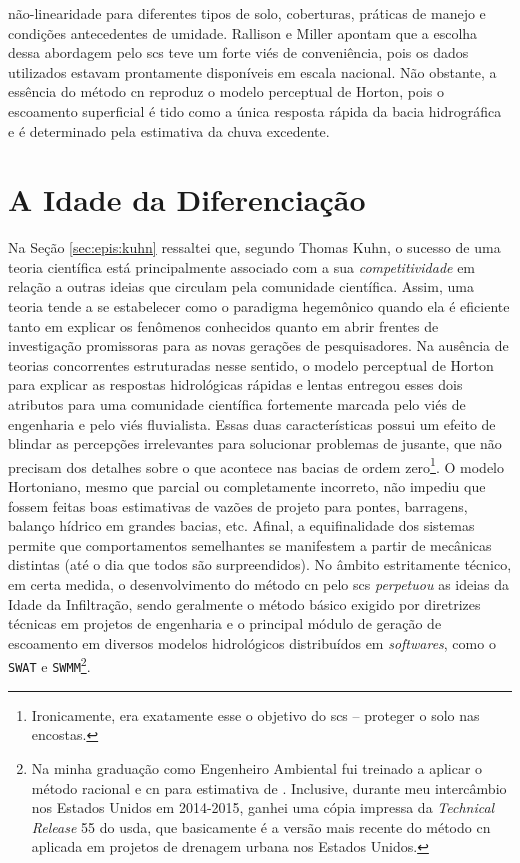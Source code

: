 \documentclass[./main.tex]{subfiles}
\begin{document}
não-linearidade para diferentes tipos de solo, coberturas, práticas de manejo e condições antecedentes de umidade. Rallison e Miller apontam que a escolha dessa abordagem pelo \acrshort{scs} teve um forte viés de conveniência, pois os dados utilizados estavam prontamente disponíveis em escala nacional. Não obstante, a essência do método \acrshort{cn} reproduz o modelo perceptual de Horton, pois o escoamento superficial é tido como a única resposta rápida da bacia hidrográfica e é determinado pela estimativa da chuva excedente. 

\section{A Idade da Diferenciação}


\par Na Seção \ref{sec:epis:kuhn} ressaltei que, segundo Thomas Kuhn, o sucesso de uma teoria científica está principalmente associado com a sua \textit{competitividade} em relação a outras ideias que circulam pela comunidade científica. Assim, uma teoria tende a se estabelecer como o paradigma hegemônico quando ela é eficiente tanto em explicar os fenômenos conhecidos quanto em abrir frentes de investigação promissoras para as novas gerações de pesquisadores. Na ausência de teorias concorrentes estruturadas nesse sentido, o modelo perceptual de Horton para explicar as respostas hidrológicas rápidas e lentas entregou esses dois atributos para uma comunidade científica fortemente marcada pelo viés de engenharia e pelo viés fluvialista. Essas duas características possui um efeito de blindar as percepções irrelevantes para solucionar problemas de jusante, que não precisam dos detalhes sobre o que acontece nas bacias de ordem zero\footnote{Ironicamente, era exatamente esse o objetivo do \acrshort{scs} -- proteger o solo nas encostas.}. O modelo Hortoniano, mesmo que parcial ou completamente incorreto, não impediu que fossem feitas boas estimativas de vazões de projeto para pontes, barragens, balanço hídrico em grandes bacias, etc. Afinal, a equifinalidade dos sistemas permite que comportamentos semelhantes se manifestem a partir de mecânicas distintas (até o dia que todos são surpreendidos). No âmbito estritamente técnico, em certa medida, o desenvolvimento do método \acrshort{cn} pelo \acrshort{scs} \textit{perpetuou} as ideias da Idade da Infiltração, sendo geralmente o método básico exigido por diretrizes técnicas em projetos de engenharia e o principal módulo de geração de escoamento em diversos modelos hidrológicos distribuídos em \textit{softwares}, como o \texttt{SWAT} e \texttt{SWMM}\footnote{Na minha graduação como Engenheiro Ambiental fui treinado a aplicar o método racional e \acrshort{cn} para estimativa de . Inclusive, durante meu intercâmbio nos Estados Unidos em 2014-2015, ganhei uma cópia impressa da \textit{Technical Release} 55 do \acrshort{usda}, que basicamente é a versão mais recente do método \acrshort{cn} aplicada em projetos de drenagem urbana nos Estados Unidos.}. 
\end{document}
